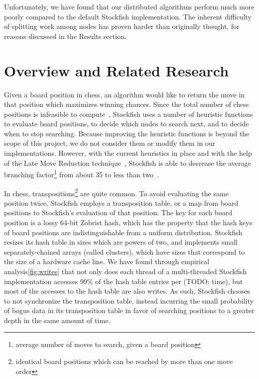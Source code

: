 \documentclass{article}
\begin{document}
Unfortunately, we have found that our distributed algorithms perform much more
poorly compared to the default Stockfish implementation. The inherent difficulty
of splitting work among nodes has proven harder than originally thought, for
reasons discussed in the Results section.

\section{Overview and Related Research}\label{Overview}
Given a board position in chess, an algorithm would like to return the move in
that position which maximizes winning chances. Since the total number of chess
positions is infeasible to compute~\cite{chesscom}, Stockfish uses a number of
heuristic functions to evaluate board positions, to decide which nodes to
search next, and to decide when to stop searching.
Because improving the heuristic functions is beyond the scope of this project, we do
not consider them or modify them in our implementations.
However, with the current heuristics in place and with the help of the Late Move
Reduction technique~\cite{wiki:LMR},
Stockfish is able to decrease the average branching
factor\footnote{average number of moves to search, given a board position} from
about 35 to less than two~\cite{stockfish:code}.

In chess, transpositions\footnote{identical board positions which can
be reached by more than one move order} are quite common.
To avoid evaluating the same position
twice, Stockfish employs a transposition table, or a map from board positions to
Stockfish's evaluation of that position. The key for each board position is a lossy 64-bit
Zobrist hash\cite{Zobrist}, which has the property that the hash keys of board
positions are 
indistinguishable from a uniform distribution. Stockfish resizes its hash table
in sizes which are powers of two, and implements small separately-chained arrays
(called clusters), which have sizes that correspond to the size of a hardware
cache line. We have found through empirical
analysis\ref{fig:writes} that not only does each thread of a multi-threaded Stockfish
implementation accesses 99\% of the hash table entries per (TODO: time), but
most of the accesses to the hash table are also writes. As such, Stockfish
chooses to not synchronize the transposition table, instead incurring
the small probability of bogus data in its transposition table in favor of
searching positions to a greater depth in the same amount of time.
\end{document}
